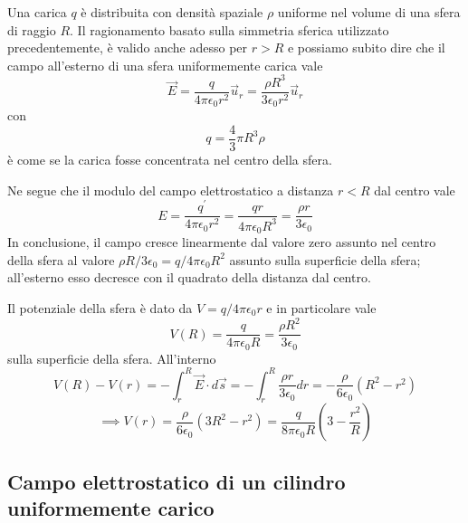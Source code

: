 \documentclass[class=book, crop=false, oneside, 12pt]{standalone}
\begin{document}
Una carica \(q\) è distribuita con densità spaziale \(\rho\) uniforme nel volume di una sfera di raggio \(R\).  
Il ragionamento basato sulla simmetria sferica utilizzato precedentemente, è valido anche adesso per \(r > R\) e possiamo subito dire che il campo all'esterno di una sfera uniformemente carica vale
\begin{equation*}
    \overrightarrow{E} = \frac{q}{4 \pi \epsilon_0 r^2}\overrightarrow{u}_r = \frac{\rho R^3}{3 \epsilon_0 r^2} \overrightarrow{u}_r
\end{equation*}
con 
\begin{equation*}
    q = \frac{4}{3} \pi R^3 \rho
\end{equation*}
è come se la carica fosse concentrata nel centro della sfera.  

Ne segue che il modulo del campo elettrostatico a distanza \(r < R\) dal centro vale
\begin{equation*}
    E = \frac{q^{\prime}}{4 \pi \epsilon_0 r^2} = \frac{q r }{4 \pi \epsilon_0 R^3} = \frac{\rho r}{3 \epsilon_0}
\end{equation*}
In conclusione, il campo cresce linearmente dal valore zero assunto nel centro della sfera al valore \(\rho R / 3 \epsilon_0 = q / 4 \pi \epsilon_0 R^2\) assunto sulla superficie della sfera; all'esterno esso decresce con il quadrato della distanza dal centro.

Il potenziale della sfera è dato da \(V = q / 4 \pi \epsilon_0 r\) e in particolare vale
\begin{equation*}
    V(R) = \frac{q}{4 \pi \epsilon_0 R} = \frac{\rho R^2}{3 \epsilon_0}
\end{equation*}
sulla superficie della sfera. All'interno
\begin{equation*}
    V(R) - V(r) = - \int_r^R \overrightarrow{E} \cdot d \overrightarrow{s} = - \int_r^R \frac{\rho r}{3 \epsilon_0} dr = - \frac{\rho}{6 \epsilon_0} (R^2 - r^2)
\end{equation*}
\begin{equation*}
    \implies V(r) = \frac{\rho}{6 \epsilon_0} (3 R^2 - r^2) = \frac{q}{8 \pi \epsilon_0 R} \left(3 - \frac{r^2}{R}\right)
\end{equation*}

\subsection{Campo elettrostatico di un cilindro uniformemente carico}
\end{document}
